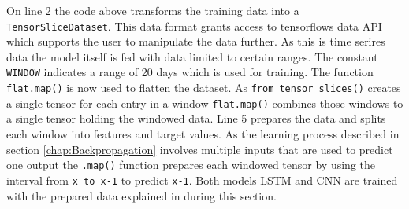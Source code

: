 On line 2 the code above transforms the training data into a \verb|TensorSliceDataset|. This data format grants access to tensorflows data API which supports the user to manipulate the data further. As this is time serires data the model itself is fed with data limited to certain ranges. The constant \verb|WINDOW| indicates a range of 20 days which is used for training. The function \verb|flat.map()| is now used to flatten the dataset. As \verb|from_tensor_slices()| creates a single tensor for each entry in a window \verb|flat.map()| combines those windows to a single tensor holding the windowed data. Line 5 prepares the data and splits each window into features and target values. As the learning process described in section \ref{chap:Backpropagation} involves multiple inputs that are used to predict one output the \verb|.map()| function prepares each windowed tensor by using the interval from \verb|x to x-1| to predict \verb|x-1|.
Both models LSTM and CNN are trained with the prepared data explained in during this section. 

